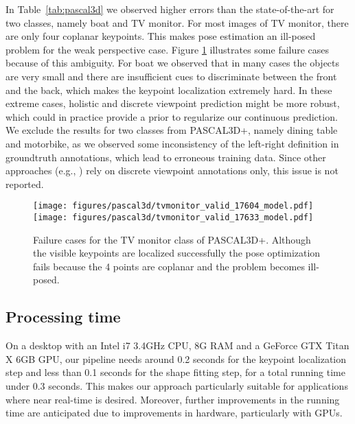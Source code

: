 \documentclass[letterpaper, 10 pt, conference]{ieeeconf}
\begin{document}
\vspace{5pt} In Table~\ref{tab:pascal3d} we observed higher errors than the state-of-the-art for two classes, namely boat and TV monitor. For most images of TV monitor, there are only four coplanar keypoints. This makes pose estimation an ill-posed problem for the weak perspective case. Figure \ref{fig:failure} illustrates some failure cases because of this ambiguity. For boat we observed that in many cases the objects are very small and there are insufficient cues to discriminate between the front and the back, which makes the keypoint localization extremely hard. In these extreme cases, holistic and discrete viewpoint prediction might be more robust, which could in practice provide a prior to regularize our continuous prediction. We exclude the results for two classes from PASCAL3D+, namely dining table and motorbike, as we observed some inconsistency of the left-right definition in groundtruth annotations, which lead to erroneous training data. Since other approaches (e.g., \cite{tulsiani2015vk}) rely on discrete viewpoint annotations only, this issue is not reported.

\begin{figure}
  \centering
   \texttt{[image: figures/pascal3d/tvmonitor\_valid\_17604\_model.pdf]}
   \texttt{[image: figures/pascal3d/tvmonitor\_valid\_17633\_model.pdf]}\\  
  \caption{Failure cases for the TV monitor class of PASCAL3D+. Although the visible keypoints are localized successfully the pose optimization fails because the 4 points are coplanar and the problem becomes ill-posed.}\label{fig:failure}
\vspace{-1em}
\end{figure}

\subsection{Processing time}

On a desktop with an Intel i7 3.4GHz CPU, 8G RAM and a GeForce GTX Titan X 6GB GPU, our pipeline needs around 0.2 seconds for the keypoint localization step and less than 0.1 seconds for the shape fitting step, for a total running time under 0.3 seconds. This makes our approach particularly suitable for applications where near real-time is desired. Moreover, further improvements in the running time are anticipated due to improvements in hardware, particularly with GPUs. 
\end{document}
